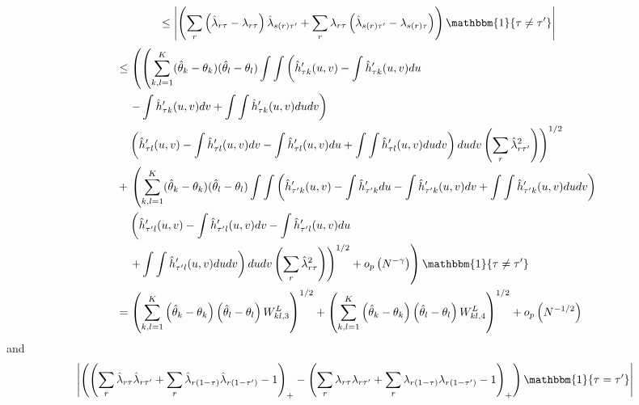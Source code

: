 \documentclass[12pt]{article}
\theoremstyle{definition}
\begin{document}
{\begin{align*}
 &\hspace{2mm}\leq \left|\left( \sum_{r}\left(\hat{\lambda}_{r\tau} - \lambda_{r\tau}\right)\hat{\lambda}_{s(r)\tau'} + \sum_{r}\lambda_{r\tau}\left(\hat{\lambda}_{s(r)\tau'} - \lambda_{s(r)\tau}\right) \right)\mathbbm{1}\{\tau \neq \tau'\}\right| \\
 \end{align*}
 \begin{align*}
 &\hspace{2mm}\leq \left(\left(\sum_{k,l=1}^{K}(\hat{\theta}_{k} - \theta_{k})(\hat{\theta}_{l} - \theta_{l})\int\int\left(\hat{h}'_{\tau k}(u,v) - \int\hat{h}'_{\tau k}(u,v)du \right.\right.\right. \\
&\hspace{5mm}\left.\left.\left. - \int\hat{h}'_{\tau k}(u,v)dv + \int\int\hat{h}'_{\tau k}(u,v)dudv\right)\right.\right.\\
&\hspace{5mm}\left.\left.\left(\hat{h}'_{\tau l}(u,v)- \int\hat{h}'_{\tau l}(u,v)dv - \int\hat{h}'_{\tau l}(u,v)du + \int\int\hat{h}'_{\tau l}(u,v)dudv\right)dudv \left(\sum_{r} \hat{\lambda}_{r\tau'}^{2}\right)\right)^{1/2}\right. \\
 &\hspace{2mm}+\left.\left(\sum_{k,l=1}^{K}(\hat{\theta}_{k} - \theta_{k})(\hat{\theta}_{l} - \theta_{l})\int\int\left(\hat{h}'_{\tau' k}(u,v) - \int\hat{h}'_{\tau' k}du - \int\hat{h}'_{\tau' k}(u,v)dv + \int\int\hat{h}'_{\tau' k}(u,v)dudv\right)\right.\right.\\
&\hspace{5mm}\left.\left.\left(\hat{h}'_{\tau' l}(u,v) - \int\hat{h}'_{\tau' l}(u,v)dv - \int\hat{h}'_{\tau' l}(u,v)du \right.\right.\right. \\
&\hspace{5mm}\left.\left.\left. + \int\int\hat{h}'_{\tau' l}(u,v)dudv\right)dudv \left(\sum_{r} \hat{\lambda}_{r\tau}^{2}\right)\right)^{1/2}+ o_{p}\left(N^{-\gamma}\right)\right)\mathbbm{1}\{\tau \neq \tau'\} \\
&\hspace{2mm}=  \left(\sum_{k,l=1}^{K} \left(\hat{\theta}_{k} - \theta_{k}\right)\left(\hat{\theta}_{l} - \theta_{l}\right)W^{L}_{kl,3}\right)^{1/2} + \left(\sum_{k,l=1}^{K} \left(\hat{\theta}_{k} - \theta_{k}\right)\left(\hat{\theta}_{l} - \theta_{l}\right)W^{L}_{kl,4}\right)^{1/2}  + o_{p}\left( N^{-1/2}\right)
\end{align*}
and 
\begin{align*}
&\left| \left(\left(\sum_r \hat{\lambda}_{r\tau}\hat{\lambda}_{r\tau'} + \sum_r \hat{\lambda}_{r(1-\tau)}\hat{\lambda}_{r(1-\tau')} - 1 \right)_{+} - \left(\sum_r {\lambda}_{r\tau}{\lambda}_{r\tau'} + \sum_r {\lambda}_{r(1-\tau)}{\lambda}_{r(1-\tau')} - 1 \right)_{+}\right)\mathbbm{1}\{\tau = \tau'\} \right|\\

\end{align*}}
\end{document}
